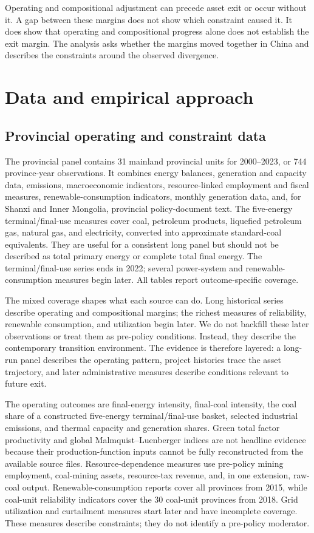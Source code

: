 \documentclass[11pt]{article}
\begin{document}
Operating and compositional adjustment can precede asset exit or occur without it. A gap between these margins does not show which constraint caused it. It does show that operating and compositional progress alone does not establish the exit margin. The analysis asks whether the margins moved together in China and describes the constraints around the observed divergence.

\section{Data and empirical approach}

\subsection{Provincial operating and constraint data}

The provincial panel contains 31 mainland provincial units for 2000--2023, or 744 province-year observations. It combines energy balances, generation and capacity data, emissions, macroeconomic indicators, resource-linked employment and fiscal measures, renewable-consumption indicators, monthly generation data, and, for Shanxi and Inner Mongolia, provincial policy-document text. The five-energy terminal/final-use measures cover coal, petroleum products, liquefied petroleum gas, natural gas, and electricity, converted into approximate standard-coal equivalents. They are useful for a consistent long panel but should not be described as total primary energy or complete total final energy. The terminal/final-use series ends in 2022; several power-system and renewable-consumption measures begin later. All tables report outcome-specific coverage.

The mixed coverage shapes what each source can do. Long historical series describe operating and compositional margins; the richest measures of reliability, renewable consumption, and utilization begin later. We do not backfill these later observations or treat them as pre-policy conditions. Instead, they describe the contemporary transition environment. The evidence is therefore layered: a long-run panel describes the operating pattern, project histories trace the asset trajectory, and later administrative measures describe conditions relevant to future exit.

The operating outcomes are final-energy intensity, final-coal intensity, the coal share of a constructed five-energy terminal/final-use basket, selected industrial emissions, and thermal capacity and generation shares. Green total factor productivity and global Malmquist--Luenberger indices are not headline evidence because their production-function inputs cannot be fully reconstructed from the available source files. Resource-dependence measures use pre-policy mining employment, coal-mining assets, resource-tax revenue, and, in one extension, raw-coal output. Renewable-consumption reports cover all provinces from 2015, while coal-unit reliability indicators cover the 30 coal-unit provinces from 2018. Grid utilization and curtailment measures start later and have incomplete coverage. These measures describe constraints; they do not identify a pre-policy moderator.
\end{document}
